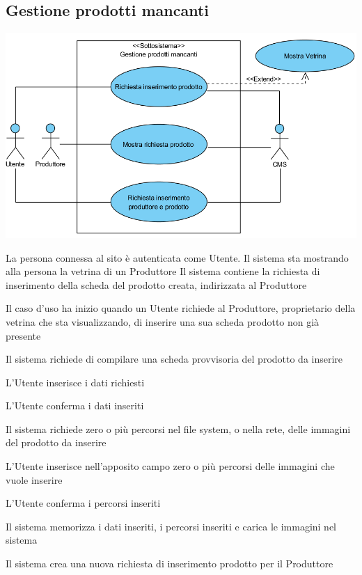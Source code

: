 \subsection{Gestione prodotti mancanti}
\begin{center}
   \includegraphics[width=\textwidth]{assets/visualParadigm/cu/GestioneProdottiMancanti}
\end{center}
{}
{La persona connessa al sito è autenticata come Utente. Il sistema sta mostrando alla persona la vetrina di un Produttore}
{Il sistema contiene la richiesta di inserimento della scheda del prodotto creata, indirizzata al Produttore}
{\begin{enumCU}
		\item Il caso d'uso ha inizio quando un Utente richiede al Produttore, proprietario della vetrina che sta visualizzando, di inserire una sua scheda prodotto non già presente
		\item Il sistema richiede di compilare una scheda provvisoria del prodotto da inserire
		\item L'Utente inserisce i dati richiesti\label{curicinsimmpro:1}
		\item L'Utente conferma i dati inseriti 
		\item Il sistema richiede zero o più percorsi nel file system, o nella rete, delle immagini del prodotto da inserire
		\item L'Utente inserisce nell'apposito campo zero o più percorsi delle immagini che vuole inserire\label{curicinsimmpro:2}
		\item L'Utente conferma i percorsi inseriti\label{curicinsimmpro:3}
		\item Il sistema memorizza i dati inseriti, i percorsi inseriti e carica le immagini nel sistema
		\item Il sistema crea una nuova richiesta di inserimento prodotto per il Produttore
	\end{enumCU}}

